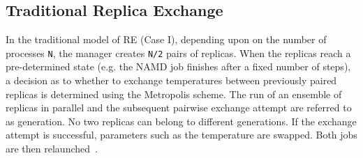 \documentclass{rspublic}
\newcommand{\jhanote}[1]{ {\textcolor{red} { ***shantenu: #1 }}}
\newcommand{\alnote}[1]{ {\textcolor{blue} { ***andre: #1 }}}
\newcommand{\alnote}[1]{}
\newcommand{\jhanote}[1]{}
\begin{document}



\subsection{Traditional Replica Exchange}
In the traditional model of RE (Case I), depending upon
on the number of processes \texttt{N}, the manager creates \texttt{N/2} pairs
of replicas. When the replicas reach a
pre-determined state (e.g. the NAMD job finishes after a fixed number
of steps), a decision as to whether to exchange temperatures between
previously paired replicas is determined using the Metropolis scheme.
The run of an ensemble of replicas in parallel and the subsequent
pairwise exchange attempt are referred to as generation. No two
replicas can belong to different generations. If the exchange attempt
is successful, parameters such as the temperature are swapped. Both
jobs are then relaunched~\cite{Luckow:2008fp}.
\end{document}

